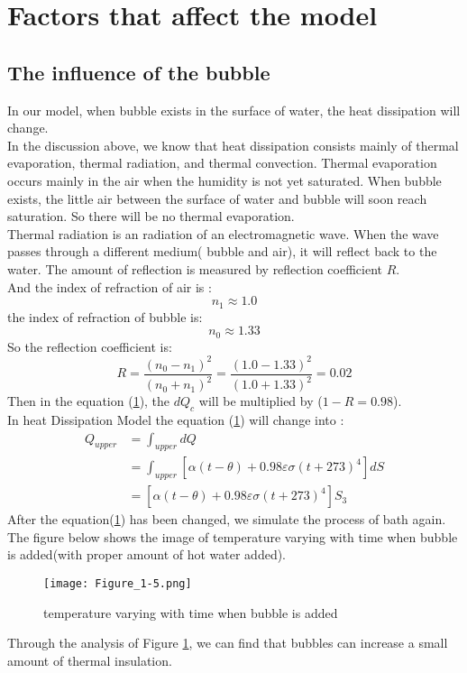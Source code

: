 \documentclass{mcmthesis}
\begin{document}
\section{Factors that affect the model}
\subsection{The influence of the bubble}
\indent In our model, when bubble exists in the surface of water, the heat dissipation will change.\\
\indent In the discussion above, we know that heat dissipation consists mainly of thermal evaporation, thermal radiation, and thermal convection. Thermal evaporation occurs mainly in the air when the humidity is not yet saturated. When bubble exists, the little air between the surface of water and bubble will soon reach saturation. So there will be no thermal evaporation.\\
\indent Thermal radiation is an radiation of an electromagnetic wave. When the wave passes through a different medium( bubble and air), it will reflect back to the water. The amount of reflection is measured by reflection coefficient $R$.\\
\indent And the index of refraction of air is :
\begin{equation}
n_{1}\approx 1.0
\end{equation}
\indent the index of refraction of bubble is: 
\begin{equation}
n_{0}\approx 1.33
\end{equation}
\indent So the reflection coefficient is: 
\begin{equation}
R=\frac{(n_{0}-n_{1})^{2}}{(n_{0}+n_{1})^{2}}=\frac{(1.0-1.33)^{2}}{(1.0+1.33)^2}=0.02
\end{equation}
\indent Then in the equation (\ref{bubble}), the $dQ_{c}$ will be multiplied by ($1-R=0.98$). \\
\indent In heat Dissipation Model the equation (\ref{bubble}) will change into :
\begin{equation}
\begin{split}
Q_{upper}&=\int_{upper}dQ\\
&=\int_{upper} [\alpha (t-\theta)+0.98\varepsilon \sigma (t+273)^{4}]dS\\
&=[\alpha (t-\theta)+0.98\varepsilon \sigma (t+273)^{4}]S_{3} 
\end{split}
\end{equation} 
\indent After the equation(\ref{bubble}) has been changed, we simulate the process of bath again.\\
\indent The figure below shows the image of temperature varying with time when bubble is added(with proper amount of hot water added).
\begin{figure}[H]
	\centerline{\texttt{[image: Figure\_1-5.png]}}
	\caption{temperature varying with time when bubble is added}
	\label{bubble}
\end{figure}
Through the analysis of Figure \ref{bubble}, we can find that bubbles can increase a small amount of thermal insulation.
\end{document}
